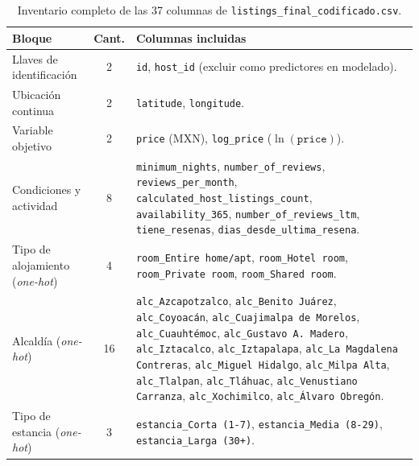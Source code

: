 \documentclass[12pt,letterpaper,oneside]{report}
\begin{document}
\begin{table}[htbp]
\centering
\caption{Inventario completo de las 37 columnas de \texttt{listings\_final\_codificado.csv}.}
\label{tab:anexo_columnas}
\footnotesize
\renewcommand{\arraystretch}{1.2}
\begin{tabularx}{\textwidth}{>{\raggedright\arraybackslash}p{3.5cm} c Y}
\toprule
{}
\textbf{Bloque} & \textbf{Cant.} & \textbf{Columnas incluidas} \\
\midrule
Llaves de identificación & 2 & \texttt{id}, \texttt{host\_id} (excluir como predictores en modelado). \\
Ubicación continua & 2 & \texttt{latitude}, \texttt{longitude}. \\
Variable objetivo & 2 & \texttt{price} (MXN), \texttt{log\_price} ($\ln(\texttt{price})$). \\
Condiciones y actividad & 8 & \texttt{minimum\_nights}, \texttt{number\_of\_reviews}, \texttt{reviews\_per\_month}, \texttt{calculated\_host\_listings\_count}, \texttt{availability\_365}, \texttt{number\_of\_reviews\_ltm}, \texttt{tiene\_resenas}, \texttt{dias\_desde\_ultima\_resena}. \\
Tipo de alojamiento (\textit{one-hot}) & 4 & \texttt{room\_Entire home/apt}, \texttt{room\_Hotel room}, \texttt{room\_Private room}, \texttt{room\_Shared room}. \\
Alcaldía (\textit{one-hot}) & 16 & \texttt{alc\_Azcapotzalco}, \texttt{alc\_Benito Juárez}, \texttt{alc\_Coyoacán}, \texttt{alc\_Cuajimalpa de Morelos}, \texttt{alc\_Cuauhtémoc}, \texttt{alc\_Gustavo A.\ Madero}, \texttt{alc\_Iztacalco}, \texttt{alc\_Iztapalapa}, \texttt{alc\_La Magdalena Contreras}, \texttt{alc\_Miguel Hidalgo}, \texttt{alc\_Milpa Alta}, \texttt{alc\_Tlalpan}, \texttt{alc\_Tláhuac}, \texttt{alc\_Venustiano Carranza}, \texttt{alc\_Xochimilco}, \texttt{alc\_Álvaro Obregón}. \\
Tipo de estancia (\textit{one-hot}) & 3 & \texttt{estancia\_Corta (1-7)}, \texttt{estancia\_Media (8-29)}, \texttt{estancia\_Larga (30+)}. \\
\bottomrule
\end{tabularx}
\end{table}
\end{document}
